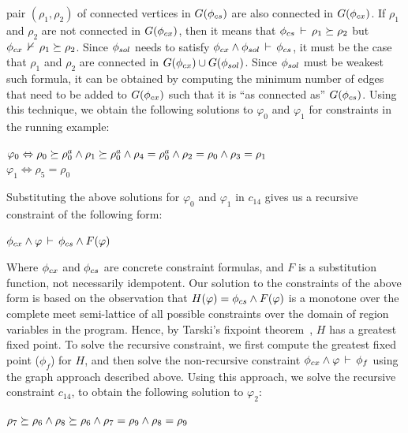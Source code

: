 pair $(\rho_1,\rho_2)$ of connected vertices in $G(\phi_{cs})$ are also
connected in $G(\phi_{cx})$. If $\rho_1$ and $\rho_2$ are not connected
in $G(\phi_{cx})$, then it means that $\phi_{cs}\,\vdash\,\rho_1
\succeq \rho_2$ but $\phi_{cx}\,\nvdash\,\rho_1 \succeq
\rho_2$. Since $\phi_{sol}$ needs to satisfy $\phi_{cx} \wedge
\phi_{sol}\,\vdash\,\phi_{cs}$, it must be the case that $\rho_1$ and $\rho_2$
are connected in $G(\phi_{cx}) \cup G(\phi_{sol})$. Since $\phi_{sol}$ must
be weakest such formula, it can be obtained by computing the minimum
number of edges that need to be added to $G(\phi_{cx})$ such that it is
``as connected as'' $G(\phi_{cs})$. Using this technique, we obtain the
following solutions to $\varphi_0$ and $\varphi_1$ for constraints in
the running example:
\vspace*{-0.05in}
\begin{center}
\(
  \varphi_0 \Leftrightarrow \rho_0 \succeq \rho^a_0 \wedge \rho_1
     \succeq \rho^a_0 \wedge \rho_4 = \rho^a_0 \wedge 
     \rho_2 = \rho_0 \wedge \rho_3 = \rho_1
\)\\
\(
  \varphi_1 \Leftrightarrow \rho_5 = \rho_0
\)
\end{center}
\vspace*{-0.1in}
Substituting the above solutions for $\varphi_0$ and $\varphi_1$ in
$c_{14}$ gives us a recursive constraint of the following form:
\vspace*{-0.05in}
\begin{center}
\(
  \phi_{cx} \wedge \varphi\,\vdash\,\phi_{cs} \wedge F(\varphi)
\)
\end{center}
\vspace*{-0.05in}
Where $\phi_{cx}$ and $\phi_{cs}$ are concrete constraint formulas, and $F$ is
a substitution function, not necessarily idempotent. Our solution to the
constraints of the above form is based on the observation that $H(\varphi) =
\phi_{cs} \wedge F(\varphi)$ is a monotone over the complete meet semi-lattice
of all possible constraints over the domain of region variables in the
program. Hence, by Tarski's fixpoint theorem~\cite{tarski}, $H$ has a
greatest fixed point. To solve the recursive constraint, we first compute the
greatest fixed point ($\phi_f$) for $H$, and then solve the non-recursive
constraint $\phi_{cx} \wedge \varphi\,\vdash\,\phi_f$ using the graph
approach described above. Using this approach, we solve the recursive
constraint $c_{14}$, to obtain the following solution to $\varphi_2$:
\begin{center}
\(
  \rho_7 \succeq \rho_6 \wedge \rho_8 \succeq \rho_6 \wedge \rho_7 =
  \rho_9 \wedge \rho_8 = \rho_9
\)
\end{center}

